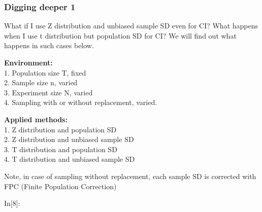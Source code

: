 \documentclass[float=false,crop=false]{standalone}
\begin{document}
    \subsubsection{Digging deeper 1}\label{digging-deeper-1}

What if I use Z distribution and unbiased sample SD even for CI? What
happens when I use t distribution but population SD for CI? We will find
out what happens in such cases below.

\textbf{Environment:}\\
1. Population size T, fixed\\
2. Sample size n, varied\\
3. Experiment size N, varied\\
4. Sampling with or without replacement, varied.

\textbf{Applied methods:}\\
1. Z distribution and population SD\\
2. Z distribution and unbiased sample SD\\
3. T distribution and population SD\\
4. T distribution and unbiased sample SD

Note, in case of sampling without replacement, each sample SD is
corrected with FPC (Finite Population Correction)
\begin{InVerbatim}[commandchars=\\\{\},fontsize=\scriptsize]
{\color{incolor}In[{\color{incolor}8}]:}    
        
        
            
          
            
        
        
          
\end{InVerbatim}
    \begin{center}
    \end{center}
    { \hspace*{\fill} \\}
    
\end{document}
